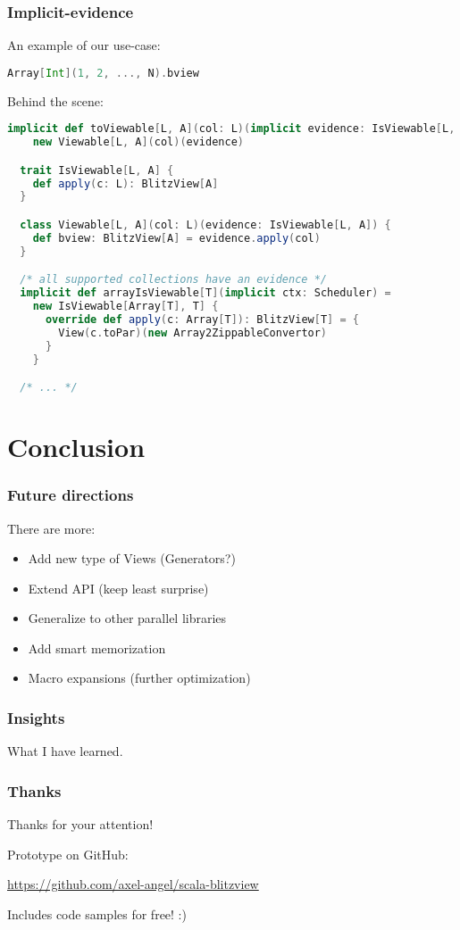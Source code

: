 \documentclass[12pt]{beamer}
\begin{document}
\begin{frame}[fragile]
    \frametitle{Implicit-evidence}
    An example of our use-case:
    \begin{lstlisting}[language=scala, basicstyle=\tiny]
  Array[Int](1, 2, ..., N).bview
    \end{lstlisting}

    Behind the scene:
    \begin{lstlisting}[language=scala, basicstyle=\tiny]
  implicit def toViewable[L, A](col: L)(implicit evidence: IsViewable[L, A]) =
    new Viewable[L, A](col)(evidence)

  trait IsViewable[L, A] {
    def apply(c: L): BlitzView[A]
  }

  class Viewable[L, A](col: L)(evidence: IsViewable[L, A]) {
    def bview: BlitzView[A] = evidence.apply(col)
  }

  /* all supported collections have an evidence */
  implicit def arrayIsViewable[T](implicit ctx: Scheduler) =
    new IsViewable[Array[T], T] {
      override def apply(c: Array[T]): BlitzView[T] = {
        View(c.toPar)(new Array2ZippableConvertor)
      }
    }

  /* ... */
    \end{lstlisting}
\end{frame}

\section{Conclusion}
\begin{frame}
    \frametitle{Future directions}
    There are more:
    \begin{itemize}
        \item Add new type of Views (Generators?)
        \item Extend API (keep least surprise)
        \item Generalize to other parallel libraries
        \item Add smart memorization
        \item Macro expansions (further optimization)
    \end{itemize}
\end{frame}

\begin{frame}
    \frametitle{Insights}
    What I have learned.
\end{frame}

\begin{frame}
    \frametitle{Thanks}
    {\Huge Thanks for your attention!}

    Prototype on GitHub:

    \url{https://github.com/axel-angel/scala-blitzview}

    Includes code samples for free! :)
\end{frame}
\end{document}

